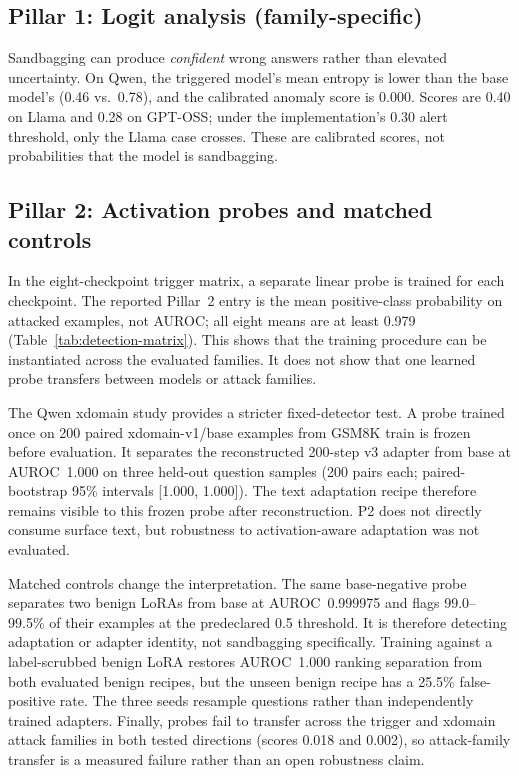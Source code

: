 \documentclass{article}
\begin{document}
\subsection{Pillar 1: Logit analysis (family-specific)}
\label{sec:pillar1}
Sandbagging can produce \emph{confident} wrong answers rather than elevated uncertainty. On Qwen, the triggered model's mean entropy is lower than the base model's (0.46 vs.\ 0.78), and the calibrated anomaly score is 0.000. Scores are 0.40 on Llama and 0.28 on GPT-OSS; under the implementation's 0.30 alert threshold, only the Llama case crosses. These are calibrated scores, not probabilities that the model is sandbagging.

\subsection{Pillar 2: Activation probes and matched controls}
\label{sec:pillar2}
In the eight-checkpoint trigger matrix, a separate linear probe is trained for each checkpoint. The reported Pillar~2 entry is the mean positive-class probability on attacked examples, not AUROC; all eight means are at least 0.979 (Table~\ref{tab:detection-matrix}). This shows that the training procedure can be instantiated across the evaluated families. It does not show that one learned probe transfers between models or attack families.

The Qwen xdomain study provides a stricter fixed-detector test. A probe trained once on 200 paired xdomain-v1/base examples from GSM8K train is frozen before evaluation. It separates the reconstructed 200-step v3 adapter from base at AUROC~1.000 on three held-out question samples (200 pairs each; paired-bootstrap 95\% intervals [1.000, 1.000]). The text adaptation recipe therefore remains visible to this frozen probe after reconstruction. P2 does not directly consume surface text, but robustness to activation-aware adaptation was not evaluated.

Matched controls change the interpretation. The same base-negative probe separates two benign LoRAs from base at AUROC~0.999975 and flags 99.0--99.5\% of their examples at the predeclared 0.5 threshold. It is therefore detecting adaptation or adapter identity, not sandbagging specifically. Training against a label-scrubbed benign LoRA restores AUROC~1.000 ranking separation from both evaluated benign recipes, but the unseen benign recipe has a 25.5\% false-positive rate. The three seeds resample questions rather than independently trained adapters. Finally, probes fail to transfer across the trigger and xdomain attack families in both tested directions (scores 0.018 and 0.002), so attack-family transfer is a measured failure rather than an open robustness claim.
\end{document}
